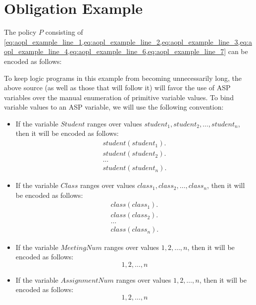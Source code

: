 
\section{Obligation Example}
\label{appendix:aopl_example}

The policy $P$ consisting of \cref{eq:aopl_example_line_1,eq:aopl_example_line_2,eq:aopl_example_line_3,eq:aopl_example_line_4,eq:aopl_example_line_6,eq:aopl_example_line_7} can be encoded as follows\footnotemark:



To keep logic programs in this example from becoming unnecessarily long, the above source (as well as those that will follow it) will favor the use of ASP variables over the manual enumeration of primitive variable values.
To bind variable values to an ASP variable, we will use the following convention:
\begin{itemize}
    \item If the variable $Student$ ranges over values $student_1, student_2, \dots, student_n$, then it will be encoded as follows:
        \begin{gather}
            student(student_1). \\
            student(student_2). \\
            \dots \\
            student(student_n).
        \end{gather}
    \item If the variable $Class$ ranges over values $class_1, class_2, \dots, class_n$, then it will be encoded as follows:
        \begin{gather}
            class(class_1). \\
            class(class_2). \\
            \dots \\
            class(class_n).
        \end{gather}
    \item If the variable $MeetingNum$ ranges over values $1, 2, \dots, n$, then it will be encoded as follows:
        \begin{equation}
            1, 2, \dots, n
        \end{equation}
    \item If the variable $AssignmentNum$ ranges over values $1, 2, \dots, n$, then it will be encoded as follows:
        \begin{equation}
            1, 2, \dots, n
        \end{equation}
\end{itemize}

